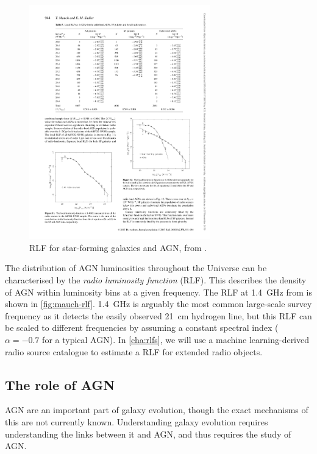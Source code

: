 \documentclass[11pt, a4paper]{book}
\newcommand{\defn}[1]{\emph{#1}}
\begin{document}
        \begin{figure}
            \centering
            \includegraphics[width=0.7\textwidth]{images/mauch07rlf.pdf}
            \caption{\label{fig:mauch-rlf} RLF for star-forming galaxies and AGN, from \citet{mauch07rlf}.}
        \end{figure}

        The distribution of AGN luminosities throughout the Universe can be characterised by the \defn{radio luminosity function} (RLF). This describes the density of AGN within luminosity bins at a given frequency. The RLF at 1.4~GHz from \citet{mauch07rlf} is shown in \autoref{fig:mauch-rlf}. 1.4~GHz is arguably the most common large-scale survey frequency as it detects the easily observed 21~cm hydrogen line, but this RLF can be scaled to different frequencies by assuming a constant spectral index ($\alpha = -0.7$ for a typical AGN). In \autoref{cha:rlfs}, we will use a machine learning-derived radio source catalogue to estimate a RLF for extended radio objects.

    \subsection{The role of AGN}
    \label{sec:role-of-agn}

        AGN are an important part of galaxy evolution, though the exact mechanisms of this are not currently known. Understanding galaxy evolution requires understanding the links between it and AGN, and thus requires the study of AGN.
\end{document}
